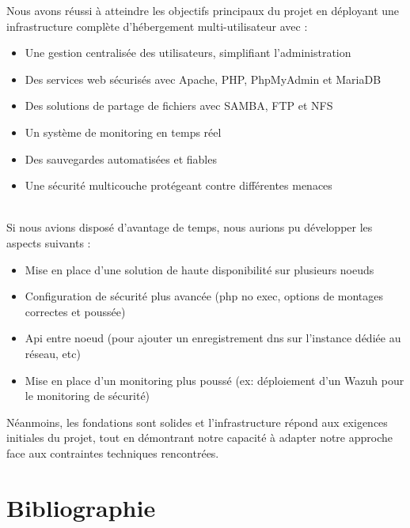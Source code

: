 \documentclass[a4paper,12pt]{article}
\begin{document}
Nous avons réussi à atteindre les objectifs principaux du projet en déployant une infrastructure complète d'hébergement multi-utilisateur avec :
\begin{itemize}
    \item Une gestion centralisée des utilisateurs, simplifiant l'administration
    \item Des services web sécurisés avec Apache, PHP, PhpMyAdmin et MariaDB
    \item Des solutions de partage de fichiers avec SAMBA, FTP et NFS
    \item Un système de monitoring en temps réel
    \item Des sauvegardes automatisées et fiables
    \item Une sécurité multicouche protégeant contre différentes menaces\\
\end{itemize}
\\
Si nous avions disposé  d'avantage de temps, nous aurions pu développer les aspects suivants :
\begin{itemize}
    \item Mise en place d'une solution de haute disponibilité sur plusieurs noeuds
    \item Configuration de sécurité plus avancée (php no exec, options de montages correctes et poussée)
    \item Api entre noeud (pour ajouter un enregistrement dns sur l'instance dédiée au réseau, etc)
    \item Mise en place d'un monitoring plus poussé (ex: déploiement d'un Wazuh pour le monitoring de sécurité)
\end{itemize}

Néanmoins, les fondations sont solides et l'infrastructure répond aux exigences initiales du projet, tout en démontrant notre capacité à adapter notre approche face aux contraintes techniques rencontrées.

\section{Bibliographie}
\end{document}

